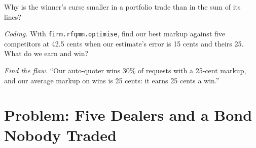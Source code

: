 \begin{exercise}[$\star\star$]\label{exo:hf:bond-and-etf-request-for-quote-market-making:6}
Why is the winner's curse smaller in a portfolio trade than in the sum of its lines?
\end{exercise}

\begin{exercise}[$\star\star\star$]\label{exo:hf:bond-and-etf-request-for-quote-market-making:7}
\emph{Coding.} With \texttt{firm.rfqmm.optimise}, find our best markup against five competitors at 42.5 cents when our estimate's error is 15
cents and theirs 25. What do we earn and win?
\end{exercise}

\begin{exercise}[$\star\star\star$]\label{exo:hf:bond-and-etf-request-for-quote-market-making:8}
\emph{Find the flaw.} ``Our auto-quoter wins 30\% of requests with a 25-cent markup, and our average markup on wins is 25 cents: it earns 25 cents
a win.''
\end{exercise}

\section{Problem: Five Dealers and a Bond Nobody Traded}

